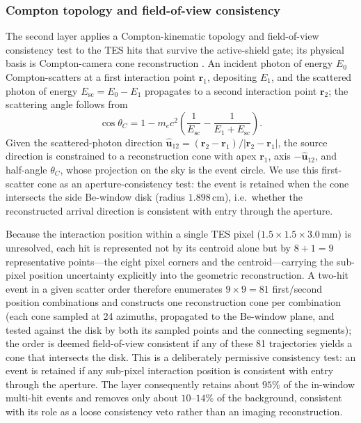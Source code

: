 \documentclass[11pt]{article}
\begin{document}
\subsubsection{Compton topology and field-of-view consistency}

The second layer applies a Compton-kinematic topology and field-of-view
consistency test to the TES hits that survive the active-shield gate; its
physical basis is Compton-camera cone reconstruction \cite{Zoglauer2006}. An
incident photon of energy $E_0$ Compton-scatters at a first interaction point
$\mathbf r_1$, depositing $E_1$, and the scattered photon of energy
$E_{\mathrm{sc}}=E_0-E_1$ propagates to a second interaction point $\mathbf r_2$;
the scattering angle follows from
\begin{equation}
  \cos\theta_C =
  1 - m_ec^2\left(\frac{1}{E_{\mathrm{sc}}}
  - \frac{1}{E_1+E_{\mathrm{sc}}}\right).
\end{equation}
Given the scattered-photon direction
$\hat{\mathbf u}_{12}=(\mathbf r_2-\mathbf r_1)/|\mathbf r_2-\mathbf r_1|$, the
source direction is constrained to a reconstruction cone with apex $\mathbf r_1$,
axis $-\hat{\mathbf u}_{12}$, and half-angle $\theta_C$, whose projection on the
sky is the event circle. We use this first-scatter cone as an aperture-consistency
test: the event is retained when the cone intersects the side Be-window disk (radius
$1.898\,\mathrm{cm}$), i.e.\ whether the reconstructed arrival direction is
consistent with entry through the aperture.

Because the interaction position within a single TES pixel
($1.5\times1.5\times3.0\,\mathrm{mm}$) is unresolved, each hit is represented not
by its centroid alone but by $8+1=9$ representative points---the eight pixel
corners and the centroid---carrying the sub-pixel position uncertainty
explicitly into the geometric reconstruction. A two-hit event in a given scatter
order therefore enumerates $9\times9=81$ first/second position combinations and
constructs one reconstruction cone per combination (each cone sampled at 24
azimuths, propagated to the Be-window plane, and tested against the disk by both
its sampled points and the connecting segments); the order is deemed
field-of-view consistent if any of these 81 trajectories yields a cone that
intersects the disk. This is a deliberately permissive consistency test: an
event is retained if any sub-pixel interaction position is consistent with entry
through the aperture. The layer consequently retains about $95\%$ of the
in-window multi-hit events and removes only about $10$--$14\%$ of the background,
consistent with its role as a loose consistency veto rather than an imaging
reconstruction.
\end{document}
